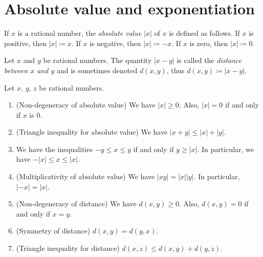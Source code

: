 \section{Absolute value and exponentiation}

\begin{definition}\label{4.3.1}
If \(x\) is a rational number, the \emph{absolute value} \(|x|\) of \(x\) is defined as follows.
If \(x\) is positive, then \(|x| \coloneqq x\).
If \(x\) is negative, then \(|x| \coloneqq -x\).
If \(x\) is zero, then \(|x| \coloneqq 0\).
\end{definition}

\begin{definition}[Distance]\label{4.3.2}
Let \(x\) and \(y\) be rational numbers.
The quantity \(|x - y|\) is called the \emph{distance between \(x\) and \(y\)} and is sometimes denoted \(d(x, y)\), thus \(d(x, y) \coloneqq |x - y|\).
\end{definition}

\begin{proposition}\label{4.3.3}
Let \(x\), \(y\), \(z\) be rational numbers.
\begin{enumerate}
    \item (Non-degeneracy of absolute value)
    We have \(|x| \geq 0\).
    Also, \(|x| = 0\) if and only if \(x\) is \(0\).
    \item (Triangle inequality for absolute value)
    We have \(|x + y| \leq |x| + |y|\).
    \item We have the inequalities \(-y \leq x \leq y\) if and only if \(y \geq |x|\).
    In particular, we have \(-|x| \leq x \leq |x|\).
    \item (Multiplicativity of absolute value)
    We have \(|xy| = |x| |y|\).
    In particular, \(|-x| = |x|\).
    \item (Non-degeneracy of distance)
    We have \(d(x, y) \geq 0\).
    Also, \(d(x, y) = 0\) if and only if \(x = y\).
    \item (Symmetry of distance)
    \(d(x, y) = d(y, x)\).
    \item (Triangle inequality for distance)
    \(d(x, z) \leq d(x, y) + d(y, z)\).
\end{enumerate}
\end{proposition}

